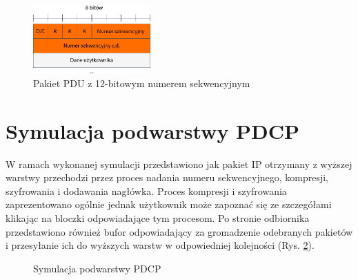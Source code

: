 \begin{figure}[ht]
	\centerline{\includegraphics[width=0.4\textwidth]{images/pdcp-pdu-12bit.png}}
	\caption{Pakiet PDU z 12-bitowym numerem sekwencyjnym}
	\label{fig:pdcp12bit}
\end{figure}

\section{Symulacja podwarstwy PDCP}

W ramach wykonanej symulacji przedstawiono jak pakiet IP otrzymany z wyższej warstwy przechodzi przez proces nadania numeru sekwencyjnego, kompresji, szyfrowania i dodawania nagłówka. Proces kompresji i szyfrowania zaprezentowano ogólnie jednak użytkownik może zapoznać się ze szczegółami klikając na bloczki odpowiadające tym procesom. Po stronie odbiornika przedstawiono również bufor odpowiadający za gromadzenie odebranych pakietów i przesyłanie ich do wyższych warstw w odpowiedniej kolejności (Rys. \ref{fig:pdcp_simulation}).

\begin{figure}[ht]
	\centerline{}
	\caption{Symulacja podwarstwy PDCP}
	\label{fig:pdcp_simulation}
\end{figure}
